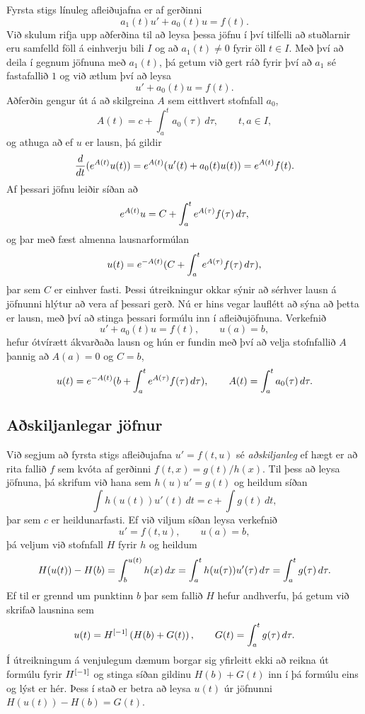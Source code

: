 Fyrsta stigs línuleg afleiðujafna er af gerðinni
 \begin{equation*}a_1(t)u'+a_0(t)u=f(t).\label{1.2.1}
 \end{equation*}
Við skulum rifja upp aðferðina til að leysa þessa jöfnu í  því tilfelli
að stuðlarnir eru samfelld föll á einhverju bili $I$ og að $a_1(t)\neq
0$ fyrir öll $t\in I$. Með því að deila í gegnum jöfnuna með $a_1(t)$,
þá getum við gert ráð fyrir því að $a_1$ sé fastafallið $1$ og við ætlum
því að leysa
 $$u'+a_0(t)u=f(t).
 $$
Aðferðin gengur út á
að skilgreina $A$ sem eitthvert stofnfall $a_0$,
 $$A(t)=c+\int_a^t a_0({\tau})\, d{\tau}, \qquad t,a\in I, 
 $$ 
og athuga að ef $u$ er lausn, þá gildir
 $$\dfrac d{dt} (e\sp{A(t)}u(t))=e\sp{A(t)}(u'(t)+a_0(t)u(t))=e\sp{A(t)}f(t).
 $$
Af þessari jöfnu leiðir síðan að 
 $$e\sp{A(t)}u=C+\int_a^t e\sp{A({\tau})}f({\tau}) \, d{\tau},
 $$
og þar með fæst almenna lausnarformúlan
 $$u(t)=e\sp{-A(t)}(C+\int_a^t e\sp{A({\tau})}f({\tau}) \, d{\tau}),
 $$
þar sem $C$ er einhver fasti.  Þessi útreikningur okkar sýnir að
sérhver lausn á jöfnunni hlýtur að vera af þessari gerð. Nú er hins
vegar lauflétt að sýna að þetta er lausn, með því að stinga þessari 
formúlu inn í
afleiðujöfnuna.  Verkefnið 
 $$u'+a_0(t)u=f(t), \qquad u(a)=b,
 $$
hefur ótvírætt ákvarðaða lausn og hún er fundin  með því að velja
stofnfallið $A$ þannig að $A(a)=0$ og $C=b$,
 \begin{equation*}
u(t)=e\sp{-A(t)}(b+\int_a\sp t e\sp{A(\tau)}f(\tau) \, d\tau), 
\qquad A(t)=\int_a\sp t a_0(\tau) \, d\tau.\label{1.2.2}
 \end{equation*}

\subsection*{Aðskiljanlegar jöfnur}

Við segjum að fyrsta stigs afleiðujafna $u'=f(t,u)$ sé
{\it aðskiljanleg} ef hægt er að
rita fallið $f$ sem kvóta af gerðinni $f(t,x)=g(t)/h(x)$.
Til þess að leysa jöfnuna, þá skrifum við hana
sem  $h(u)u'=g(t)$ og heildum síðan
$$ \int h(u(t))u'(t) \, dt = c+\int g(t)\, dt, $$
þar sem $c$ er heildunarfasti.  Ef við viljum síðan leysa verkefnið
$$ u'=f(t,u), \qquad u(a)=b, $$
þá  veljum við stofnfall $H$ fyrir
$h$ og heildum
 \begin{equation*}H(u(t))-H(b)= \int_b\sp{u(t)} h(x) \, dx =
\int_a\sp t h(u({\tau}))u'({\tau}) \, d{\tau} = 
\int_a\sp t g(\tau) \, d\tau.\label{1.2.3}
 \end{equation*}
Ef til er grennd um punktinn $b$ þar sem fallið $H$ hefur andhverfu,
þá getum við skrifað lausnina sem
 \begin{equation*}u(t) = H\sp{[-1]}\left( H(b)+G(t)\right), \qquad G(t)=\int_a\sp t
g(\tau)\, d\tau. \label{1.2.4}
 \end{equation*}
Í útreikningum á venjulegum dæmum borgar sig yfirleitt ekki að reikna
út formúlu fyrir $H\sp {[-1]}$ og stinga síðan gildinu $H(b)+G(t)$
inn í þá formúlu eins og lýst er hér.  Þess í stað er betra að
leysa $u(t)$ úr jöfnunni $H(u(t))-H(b)=G(t)$.

